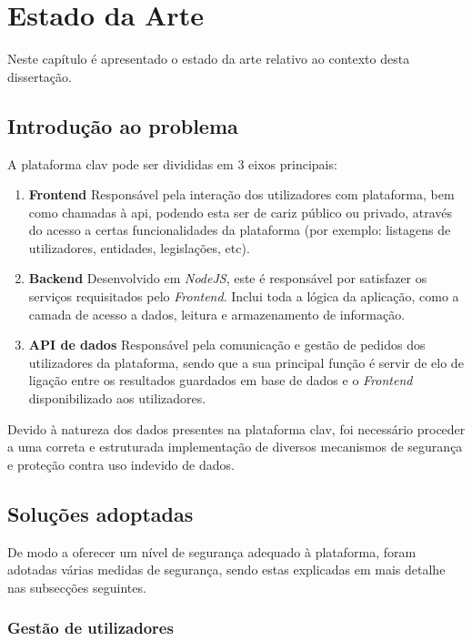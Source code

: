 \chapter{Estado da Arte}

Neste capítulo é apresentado o estado da arte relativo ao contexto desta dissertação. 

\section{Introdução ao problema}

A plataforma \gls{clav} pode ser divididas em 3 eixos principais:

\begin{enumerate}
    \item \textbf{Frontend}
    Responsável pela interação dos utilizadores com plataforma, bem como chamadas à \gls{api}, podendo esta ser de cariz público ou privado, através do acesso a certas funcionalidades da plataforma (por exemplo: listagens de utilizadores, entidades, legislações, etc).
    
    \item \textbf{Backend}
    Desenvolvido em \emph{NodeJS}, este é responsável por satisfazer os serviços requisitados pelo \emph{Frontend}. Inclui toda a lógica da aplicação, como a camada de acesso a dados, leitura e armazenamento de informação.
    
    \item \textbf{API de dados}
    Responsável pela comunicação e gestão de pedidos dos utilizadores da plataforma, sendo que a sua principal função é servir de elo de ligação entre os resultados guardados em base de dados e o \emph{Frontend} disponibilizado aos utilizadores.
\end{enumerate}

Devido à natureza dos dados presentes na plataforma \gls{clav}, foi necessário proceder a uma correta e estruturada implementação de diversos mecanismos de segurança e proteção contra uso indevido de dados.

\cleardoublepage
\section{Soluções adoptadas}

De modo a oferecer um nível de segurança adequado à plataforma, foram adotadas várias medidas de segurança, sendo estas explicadas em mais detalhe nas subsecções seguintes.

\subsection{Gestão de utilizadores}

